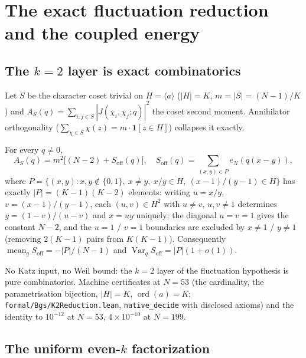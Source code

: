 
\section{The exact fluctuation reduction and the coupled energy}
\label{sec:r92}

\subsection{The \texorpdfstring{$k=2$}{k=2} layer is exact combinatorics}

Let $S$ be the character coset trivial on $H = \langle a\rangle$
($|H| = K$, $m = |S| = (N{-}1)/K$) and
$A_S(q) = \sum_{i,j \in S} |J(\chi_i,\chi_j;q)|^2$ the coset second
moment.  Annihilator orthogonality
($\sum_{\chi \in S} \chi(z) = m \cdot \mathbf{1}[z \in H]$) collapses it
exactly.

\begin{theorem}[$k=2$ combinatorial reduction]
\label{thm:k2exact}
For every $q \neq 0$,
\[
  A_S(q) = m^2 \big[ (N-2) + S_{\mathrm{off}}(q) \big],
  \quad
  S_{\mathrm{off}}(q) = \sum_{(x,y) \in P} e_N(q(x-y)),
\]
where
$P = \{(x,y) : x,y \notin \{0,1\},\ x \ne y,\ x/y \in H,\
(x{-}1)/(y{-}1) \in H\}$
has exactly $|P| = (K{-}1)(K{-}2)$ elements: writing
$u = x/y$, $v = (x{-}1)/(y{-}1)$, each $(u,v) \in H^2$ with
$u \ne v$, $u,v \ne 1$ determines $y = (1{-}v)/(u{-}v)$ and $x = uy$
uniquely; the diagonal $u = v = 1$ gives the constant $N{-}2$, and the
$u = 1$ / $v = 1$ boundaries are excluded by $x \ne 1$ / $y \ne 1$
(removing $2(K{-}1)$ pairs from $K(K{-}1)$).  Consequently
$\operatorname{mean}_q S_{\mathrm{off}} = -|P|/(N{-}1)$ and
$\operatorname{Var}_q S_{\mathrm{off}} = |P|(1+o(1))$.
\end{theorem}

No Katz input, no Weil bound: the $k{=}2$ layer of the fluctuation
hypothesis is pure combinatorics.  Machine certificates at $N = 53$
(the cardinality, the parametrisation bijection, $|H| = K$,
$\operatorname{ord}(a) = K$; \texttt{formal/Bgs/K2Reduction.lean},
\texttt{native\_decide} with disclosed axioms) and the identity to
$10^{-12}$ at $N = 53$, $4 \times 10^{-10}$ at $N = 199$.

\subsection{The uniform even-\texorpdfstring{$k$}{k} factorization}

